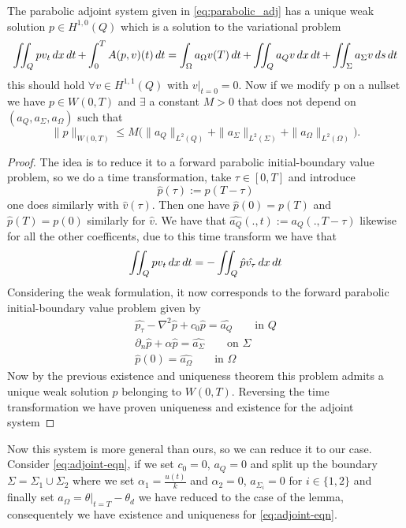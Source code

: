 \begin{lemma}
The parabolic adjoint system given in \eqref{eq:parabolic_adj} has a unique weak solution $p \in H^{1,0}(Q)$ which is a solution to the variational problem 
\begin{equation*}
    \iint_Q pv_t \mathop{dx}\mathop{dt} + \int_0^TA(p,v)(t)\mathop{dt} = \int_{\Omega}a_{\Omega}v(T) \mathop{dt} + \iint_Q a_Qv \mathop{dx}\mathop{dt} + \iint_{\Sigma}a_{\Sigma}v \mathop{ds}\mathop{dt}
\end{equation*}
this should hold $\forall v \in H^{1,1}(Q)$ with $v|_{t=0} = 0$. Now if we modify p on a nullset we have $p\in W(0,T)$ and $\exists$ a constant $M>0$ that does not depend on $(a_Q,a_{\Sigma}, a_{\Omega})$ such that 
\begin{equation*}
    \|p\|_{W(0,T)} \leq M \bigg (\|a_Q\|_{L^2(Q)} + \|a_{\Sigma}\|_{L^2(\Sigma)} + \|a_{\Omega}\|_{L^2(\Omega)} \bigg ).
\end{equation*}
\end{lemma}

\begin{proof}
The idea is to reduce it to a forward parabolic initial-boundary value problem, so we do a time transformation, take $\tau \in [0,T]$ and introduce 
\begin{equation*}
    \hat{p}(\tau) := p(T-\tau)
\end{equation*}
one does similarly with $\hat{v}(\tau)$. Then one have $\hat{p}(0) = p(T)$ and $\hat{p}(T) = p(0)$ similarly for $\hat{v}$. We have that $\hat{a_Q}(.,t):= a_Q(.,T-\tau)$ likewise for all the other coefficents, due to this time transform we have that
\begin{equation*}
    \iint_Qpv_t \mathop{dx}\mathop{dt} = - \iint_Q \hat{p}\hat{v_{\tau}} \mathop{dx}\mathop{dt}
\end{equation*}
Considering the weak formulation, it now corresponds to the forward parabolic initial-boundary value problem given by 
\begin{align*}
    \hat{p_{\tau}} - \nabla^2 \hat{p} + c_0 \hat{p} = \hat{a_Q} \qquad \text{in } Q \\
    \partial_n \hat{p} + \alpha \hat{p} = \hat{a_{\Sigma}} \qquad \text{on } \Sigma \\
    \hat{p}(0) = \hat{a_{\Omega}} \qquad \text{in } \Omega
\end{align*}
Now by the previous existence and uniqueness theorem this problem admits a unique weak solution $\hat{p}$ belonging to $W(0,T)$. Reversing the time transformation we have proven uniqueness and existence for the adjoint system
\end{proof}
Now this system is more general than ours, so we can reduce it to our case. Consider \eqref{eq:adjoint-eqn}, if we set $c_0 = 0$, $a_Q = 0$ and split up the boundary $\Sigma = \Sigma_1 \cup \Sigma_2$ where we set $\alpha_1 = \frac{u(t)}{k}$ and $\alpha_2 = 0$, $a_{\Sigma_i}=0$ for $i\in \{1,2 \}$ and finally set $a_{\Omega} = \theta|_{t=T}-\theta_d$ we have reduced to the case of the lemma, consequentely we have existence and uniqueness for \eqref{eq:adjoint-eqn}.



